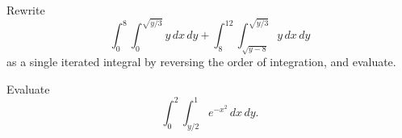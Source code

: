 \documentclass[11pt,letterpaper,boxed]{hmcpset}
\begin{document}
\begin{solution}
\vfill
\end{solution}
\newpage

\begin{problem}[Colley 5.3 \#13]
Rewrite
\[
	\int_0^8\int_0^{\sqrt{y/3}}y\,dx\,dy+\int_8^{12}\int_{\sqrt{y-8}}^{\sqrt{y/3}}y\,dx\,dy
\]
as a single iterated integral by reversing the order of integration, and evaluate.
\end{problem}

\begin{solution}
\vfill
\end{solution}
\newpage

\begin{problem}[Colley 5.3 \#18]
Evaluate
\[
	\int_0^2\int_{y/2}^1e^{-x^2}\,dx\,dy.
\]
\end{problem}

\begin{solution}
\vfill
\end{solution}
\end{document}
